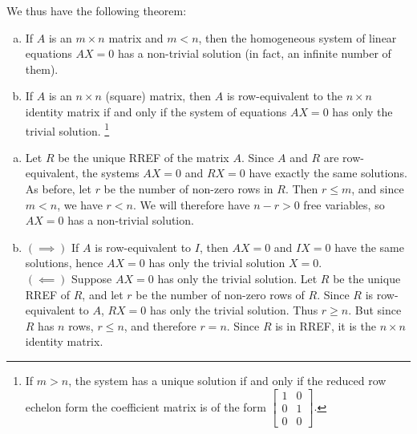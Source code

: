\documentclass[12pt,letterpaper,reqno]{article}
\numberwithin{equation}{section}
\begin{document}
 We thus have the following theorem:

\begin{thm}\label{thm:solution_sets_of_homogeneous_linear_systems} \hspace{10cm}
	\begin{enumerate}[(a)]
		\item If $A$ is an $m \times n$ matrix and $m<n$, then the homogeneous system of linear equations $AX=0$ has a non-trivial solution (in fact, an infinite number of them). 
		\item If $A$ is an $n \times n$ (square) matrix, then $A$ is row-equivalent to the $n \times n$ identity matrix if and only if the system of equations $AX=0$ has only the trivial solution. \footnote{If $m>n$, the system has a unique solution if and only if the reduced row echelon form the coefficient matrix is of the form
$
	\begin{bmatrix}
		1&0 \\ 0 & 1 \\ 0 & 0
	\end{bmatrix}.
$
}
	\end{enumerate}
\end{thm}

\begin{pf}
	\begin{enumerate}[(a)]
		\item Let $R$ be the unique RREF of the matrix $A$. Since $A$ and $R$ are row-equivalent, the systems $AX=0$ and $RX=0$ have exactly the same solutions. As before, let $r$ be the number of non-zero rows in $R$. Then $r \leq m$, and since $m < n$, we have $r<n$. We will therefore have $n-r>0$ free variables, so $AX=0$ has a non-trivial solution. 
		\item $(\implies)$ If $A$ is row-equivalent to $I$, then $AX=0$ and $IX=0$ have the same solutions, hence $AX=0$ has only the trivial solution $X=0$. \\
		$(\impliedby)$ Suppose $AX=0$ has only the trivial solution. Let $R$ be the unique RREF of $R$, and let $r$ be the number of non-zero rows of $R$. Since $R$ is row-equivalent to $A$, $RX=0$ has only the trivial solution. Thus $r \geq n$. But since $R$ has $n$ rows, $r \leq n$, and therefore $r=n$. Since $R$ is in RREF, it is the $n \times n$ identity matrix.
	\end{enumerate}
\end{pf}
\end{document}
